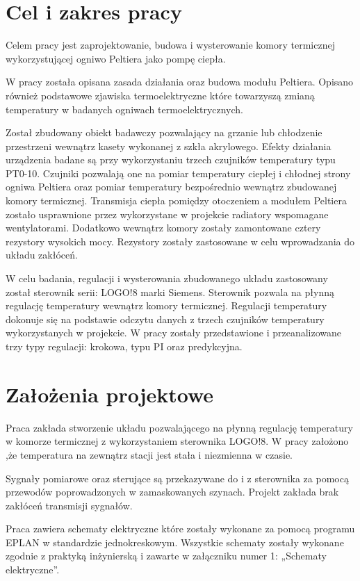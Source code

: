 \documentclass[oneside]{mgr}
\begin{document}
\section{Cel i zakres pracy}

Celem pracy jest zaprojektowanie, budowa i wysterowanie komory termicznej wykorzystującej ogniwo Peltiera jako pompę ciepła.

W pracy została opisana zasada działania oraz budowa modułu Peltiera. Opisano również podstawowe zjawiska termoelektryczne które towarzyszą zmianą temperatury w badanych ogniwach termoelektrycznych.

Został zbudowany obiekt badawczy pozwalający na grzanie lub chłodzenie przestrzeni wewnątrz kasety wykonanej z szkła akrylowego. Efekty działania urządzenia badane są przy wykorzystaniu trzech czujników temperatury typu PT0-10. Czujniki pozwalają one na pomiar temperatury ciepłej i chłodnej strony ogniwa Peltiera oraz pomiar temperatury bezpośrednio wewnątrz zbudowanej komory termicznej. Transmisja ciepła pomiędzy otoczeniem a modułem Peltiera zostało usprawnione przez wykorzystane w projekcie radiatory wspomagane wentylatorami. Dodatkowo wewnątrz komory zostały zamontowane cztery rezystory wysokich mocy. Rezystory zostały zastosowane w celu wprowadzania do układu zakłóceń.

W celu badania, regulacji i wysterowania zbudowanego układu zastosowany został sterownik serii: LOGO!8 marki Siemens. Sterownik pozwala na płynną regulację temperatury wewnątrz komory termicznej. Regulacji temperatury dokonuje się na podstawie odczytu danych z trzech czujników temperatury wykorzystanych w projekcie. W pracy zostały przedstawione i przeanalizowane trzy typy regulacji: krokowa, typu PI oraz predykcyjna.

\section{Założenia projektowe}
Praca zakłada stworzenie układu pozwalającego na płynną regulację temperatury w komorze termicznej z wykorzystaniem sterownika LOGO!8. W pracy założono ,że temperatura na zewnątrz stacji jest stała i niezmienna w czasie.

Sygnały pomiarowe oraz sterujące są przekazywane do i z sterownika za pomocą przewodów poprowadzonych w zamaskowanych szynach. Projekt zakłada brak zakłóceń transmisji sygnałów.

Praca zawiera schematy elektryczne które zostały wykonane za pomocą programu EPLAN w standardzie jednokreskowym. Wszystkie schematy zostały wykonane zgodnie z praktyką inżynierską i zawarte w załączniku numer 1: „Schematy elektryczne”.
\end{document}

